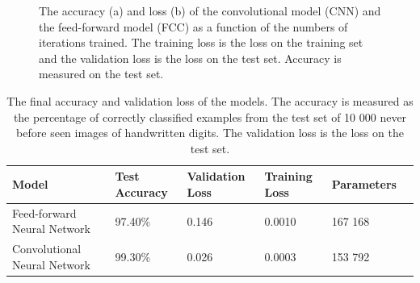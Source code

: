 \documentclass[a4paper, twoside]{article}
\begin{document}
\begin{figure}[h]
    \centering
    \caption{The accuracy (a) and loss (b) of the convolutional model (CNN) and the feed-forward model (FCC) as a function of the numbers of iterations trained. The training loss is the loss on the training set and the validation loss is the loss on the test set. Accuracy is measured on the test set.} \label{figaccloss}
    
\end{figure}
\begin{table}[h]
\begin{center}
    \begin{tabular}{| l | l | l | l | l | l |}
    \hline
    Model & Test Accuracy & Validation Loss & Training Loss & Parameters\\ \hline
    Feed-forward Neural Network & 97.40\% & 0.146 & 0.0010 & 167 168 \\ \hline
    Convolutional Neural Network & 99.30\% & 0.026 & 0.0003 & 153 792\\ \hline
    \end{tabular}
    \caption{The final accuracy and validation loss of the models. The accuracy is measured as the percentage of correctly classified examples from the test set of 10 000 never before seen images of handwritten digits. The validation loss is the loss on the test set.} \label{tablemnist}
\end{center}
\end{table}
\end{document}
